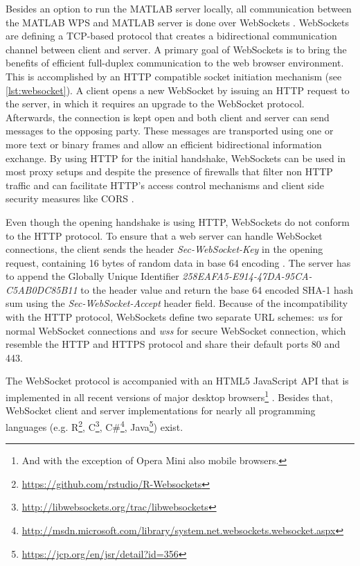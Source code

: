   Besides an option to run the MATLAB server locally, all communication between the MATLAB WPS and MATLAB server is done over WebSockets \citep{ietf:rfc6455}. WebSockets are defining a TCP-based protocol that creates a bidirectional communication channel between client and server. A primary goal of WebSockets is to bring the benefits of efficient full-duplex communication to the web browser environment. This is accomplished by an HTTP compatible socket initiation mechanism (see \cref{lst:websocket}). A client opens a new WebSocket by issuing an HTTP request to the server, in which it requires an upgrade to the WebSocket protocol. Afterwards, the connection is kept open and both client and server can send messages to the opposing party. These messages are transported using one or more text or binary frames and allow an efficient bidirectional information exchange. By using HTTP for the initial handshake, WebSockets can be used in most proxy setups and despite the presence of firewalls that filter non HTTP traffic and can facilitate HTTP's access control mechanisms and client side security measures like \acl{CORS} \citep[\acs{CORS},][]{w3c:cors}.

  

  Even though the opening handshake is using HTTP, WebSockets do not conform to the HTTP protocol. To ensure that a web server can handle WebSocket connections, the client sends the header \emph{Sec-WebSocket-Key} in the opening request, containing 16 bytes of random data in base 64 encoding \citep{ietf:rfc4648}. The server has to append the Globally Unique Identifier \cite[GUID,][]{ietf:rfc4122} \emph{258EAFA5-E914-47DA-95CA-C5AB0DC85B11} to the header value and return the base 64 encoded SHA-1 \citep{NistFIPS1803} hash sum using the \emph{Sec-WebSocket-Accept} header field. Because of the incompatibility with the HTTP protocol, WebSockets define two separate URL schemes: \emph{ws} for normal WebSocket connections and \emph{wss} for secure WebSocket connection, which resemble the HTTP and HTTPS protocol and share their default ports 80 and 443.

  The WebSocket protocol is accompanied with an HTML5 JavaScript \ac{API} \citep{w3c:ws} that is implemented in all recent versions of major desktop browsers\footnote{And with the exception of Opera Mini also mobile browsers.} \citep{caniuse}. Besides that, WebSocket client and server implementations for nearly all programming languages (e.g. R\footnote{\url{https://github.com/rstudio/R-Websockets}}, C\footnote{\url{http://libwebsockets.org/trac/libwebsockets}}, C\#\footnote{\url{http://msdn.microsoft.com/library/system.net.websockets.websocket.aspx}}, Java\footnote{\url{https://jcp.org/en/jsr/detail?id=356}}) exist.


